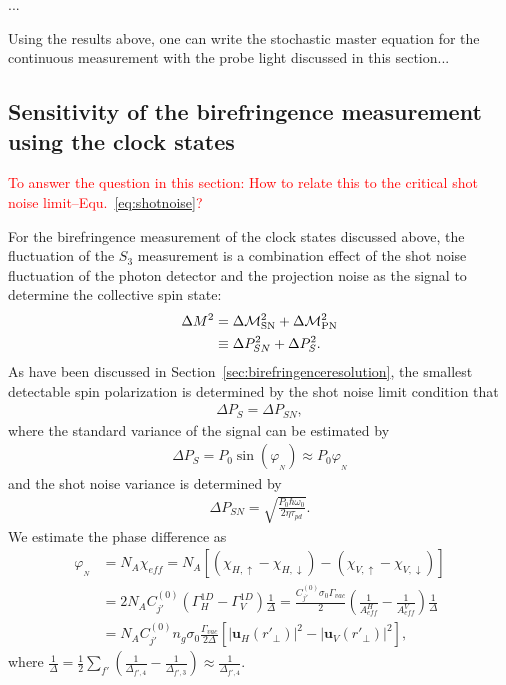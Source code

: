 ...

Using the results above, one can write the stochastic master equation for the continuous measurement with the probe light discussed in this section...


\subsection{Sensitivity of the birefringence measurement using the clock states}
\textcolor{red}{To answer the question in this section: How to relate this to the critical shot noise limit--Equ.~\eqref{eq:shotnoise}?}  

For the birefringence measurement of the clock states discussed above, the fluctuation of the $ S_3 $ measurement is a combination effect of the shot noise fluctuation of the photon detector and the projection noise as the signal to determine the collective spin state:
\begin{align}
\Delta M^2 &= \Delta\mathcal{M}_{\rm SN}^2 + \Delta\mathcal{M}_{\rm PN}^2\\
&\equiv \Delta P^2_{SN} + \Delta P^2_S .
\end{align}
As have been discussed in Section~\ref{sec:birefringenceresolution}, the smallest detectable spin polarization is determined by the shot noise limit condition that 
\begin{align}
\Delta P_S = \Delta P_{SN},
\end{align}
where the standard variance of the signal can be estimated by
\begin{align}
\Delta P_S=P_0 \sin(\varphi_{_N}) \approx P_0 \varphi_{_N}
\end{align}
and the shot noise variance is determined by
\begin{align}
\Delta P_{SN} = \sqrt{\frac{P_0 \hbar \omega_0 }{2\eta \tau_{pd}}}.
\end{align}
We estimate the phase difference as
\begin{align}
\varphi_{_N} &= N_A \chi_{e\!f\!f}=N_A [(\chi_{H,\uparrow}-\chi_{H,\downarrow})-(\chi_{V,\uparrow}-\chi_{V,\downarrow})]\\
&= 2N_AC_{j'}^{(0)}(\Gamma_{H}^{1D}-\Gamma_V^{1D})\frac{1}{\Delta}=\frac{C_{j'}^{(0)}\sigma_0\Gamma_{vac}}{2}(\frac{1}{A^H_{e\!f\!f}}-\frac{1}{A^V_{e\!f\!f}})\frac{1}{\Delta}\\
&=N_AC_{j'}^{(0)}n_g\sigma_0\frac{\Gamma_{vac}}{2\Delta}\left[| \mathbf{u}_H(r'_{\!\perp})|^2- | \mathbf{u}_V(r'_{\!\perp})|^2 \right],
\end{align}
where $\frac{1}{\Delta}=\frac{1}{2}\sum_{f'}(\frac{1}{\Delta_{f',4}}-\frac{1}{\Delta_{f',3}})\approx \frac{1}{\Delta_{f',4}}$.

